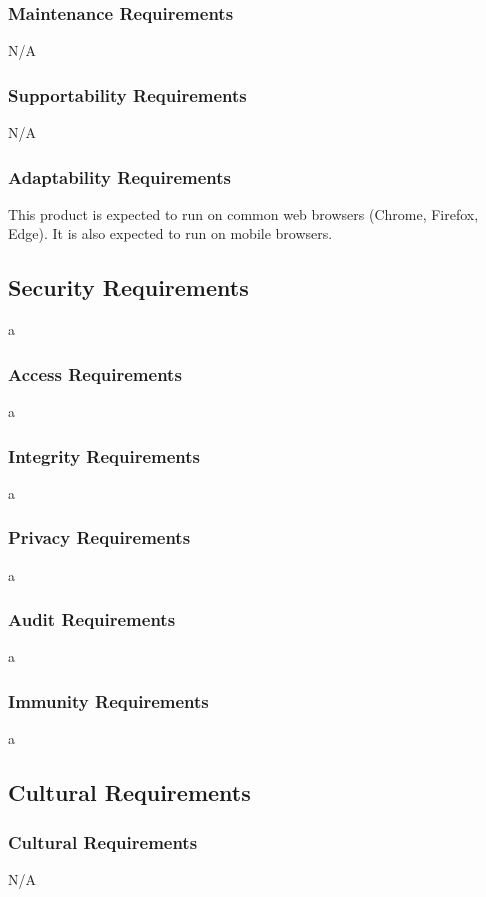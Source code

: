 \documentclass[12pt]{article}
\begin{document}
\subsubsection{Maintenance Requirements}
N/A

\subsubsection{Supportability Requirements}
N/A

\subsubsection{Adaptability Requirements}
This product is expected to run on common web browsers (Chrome, Firefox, Edge). It is also expected to run on mobile browsers.

\subsection{Security Requirements}
a

\subsubsection{Access Requirements}
a

\subsubsection{Integrity Requirements}
a
\subsubsection{Privacy Requirements}
a

\subsubsection{Audit Requirements}
a

\subsubsection{Immunity Requirements}
a

\subsection{Cultural Requirements}

\subsubsection{Cultural Requirements}
N/A
\end{document}

